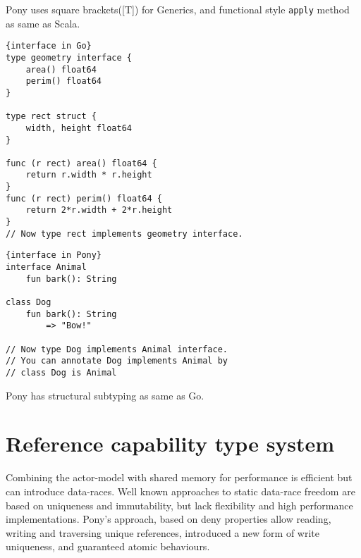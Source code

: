 \documentclass{article}
\begin{document}
Pony uses square brackets([T]) for Generics, and functional style \texttt{apply} method as same as Scala\cite{scala}. \\


\begin{lstlisting}{interface in Go}
type geometry interface {
    area() float64
    perim() float64
}

type rect struct {
    width, height float64
}

func (r rect) area() float64 {
    return r.width * r.height
}
func (r rect) perim() float64 {
    return 2*r.width + 2*r.height
}
// Now type rect implements geometry interface.

\end{lstlisting}

\begin{lstlisting}{interface in Pony}
interface Animal
	fun bark(): String
	
class Dog
	fun bark(): String
		=> "Bow!"	
	
// Now type Dog implements Animal interface.
// You can annotate Dog implements Animal by 
// class Dog is Animal
\end{lstlisting}
 
Pony has structural subtyping as same as Go\cite{go}.

\section{Reference capability type system}
Combining the actor-model with shared memory for performance is efficient but can introduce data-races. Well known approaches to static data-race freedom are based on uniqueness and immutability, but lack flexibility and high performance implementations. Pony's approach, based on deny properties allow reading, writing and traversing unique references, introduced a new form of write uniqueness, and guaranteed atomic behaviours.
\end{document}
